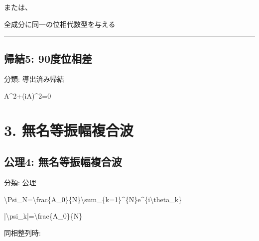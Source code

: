 \documentclass[
  a4paper,
]{ltjsarticle}
\newenvironment{Shaded}{}{}
\newcommand{\NormalTok}[1]{#1}
\begin{document}
または、

\begin{Shaded}
\begin{Highlighting}[]
\NormalTok{全成分に同一の位相代数型を与える}
\end{Highlighting}
\end{Shaded}

\begin{center}\rule{0.5\linewidth}{0.5pt}\end{center}

\subsection{帰結5:
90度位相差}\label{ux5e30ux7d505-90ux5ea6ux4f4dux76f8ux5dee}

分類: 導出済み帰結

\begin{Shaded}
\begin{Highlighting}[]
\NormalTok{A\^{}2+(iA)\^{}2=0}
\end{Highlighting}
\end{Shaded}

\section{3.
無名等振幅複合波}\label{ux7121ux540dux7b49ux632fux5e45ux8907ux5408ux6ce2}

\subsection{公理4:
無名等振幅複合波}\label{ux516cux74064-ux7121ux540dux7b49ux632fux5e45ux8907ux5408ux6ce2}

分類: 公理

\begin{Shaded}
\begin{Highlighting}[]
\NormalTok{\textbackslash{}Psi\_N=\textbackslash{}frac\{A\_0\}\{N\}\textbackslash{}sum\_\{k=1\}\^{}\{N\}e\^{}\{i\textbackslash{}theta\_k\}}
\end{Highlighting}
\end{Shaded}

\begin{Shaded}
\begin{Highlighting}[]
\NormalTok{|\textbackslash{}psi\_k|=\textbackslash{}frac\{A\_0\}\{N\}}
\end{Highlighting}
\end{Shaded}

同相整列時:
\end{document}
